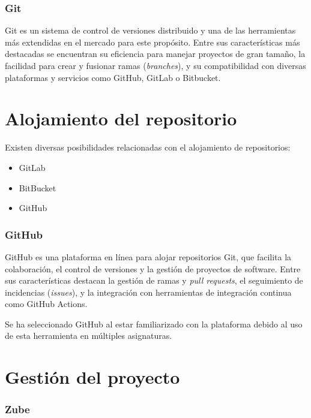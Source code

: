 \subsubsection{Git}

Git es un sistema de control de versiones distribuido y una de las herramientas 
más extendidas en el mercado para este propósito. Entre sus características más destacadas se 
encuentran su eficiencia para manejar proyectos de gran tamaño, la facilidad para crear y fusionar 
ramas (\textit{branches}), y su compatibilidad con diversas plataformas y servicios como GitHub, GitLab o Bitbucket.


\section{Alojamiento del repositorio}

Existen diversas posibilidades relacionadas con el alojamiento de repositorios:

\begin{itemize}
    \item GitLab~\cite{web:GitLab}
    \item BitBucket~\cite{web:Bitbucket}
    \item GitHub~\cite{web:GitHub}
\end{itemize}

\subsubsection{GitHub}

GitHub es una plataforma en línea para alojar repositorios Git, que 
facilita la colaboración, el control de versiones y la gestión de proyectos de software. 
Entre sus características destacan la gestión de ramas y \textit{pull requests}, el seguimiento 
de incidencias (\textit{issues}), y la integración con herramientas de integración continua como 
GitHub Actions.

Se ha seleccionado GitHub al estar familiarizado con la plataforma debido al uso de 
esta herramienta en múltiples asignaturas.

\section{Gestión del proyecto}

\subsubsection{Zube}
